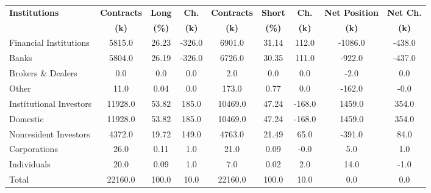 \documentclass[article,crop=false]{standalone}%
\begin{document}
%
\normalsize%
\setlength{\tabcolsep}{0.15cm}%
\begin{tabular}[h]{l | c c c | c c c | c c}%
\hline%
\rowcolor{white}%
\textbf{Institutions}&\textbf{Contracts}&\textbf{Long}&\textbf{Ch.}&\textbf{Contracts}&\textbf{Short}&\textbf{Ch.}&\textbf{Net Position}&\textbf{Net Ch.}\\%
\rowcolor{white}%
\textbf{}&\textbf{(k)}&\textbf{(\%)}&\textbf{(k)}&\textbf{(k)}&\textbf{(\%)}&\textbf{(k)}&\textbf{(k)}&\textbf{(k)}\\%
\hline%
\rowcolor{lightgray}%
Financial Institutions&5815.0&26.23&{-}326.0&6901.0&31.14&112.0&{-}1086.0&{-}438.0\\%
\rowcolor{white}%
Banks&5804.0&26.19&{-}326.0&6726.0&30.35&111.0&{-}922.0&{-}437.0\\%
\rowcolor{lightgray}%
Brokers \& Dealers&0.0&0.0&0.0&2.0&0.0&0.0&{-}2.0&0.0\\%
\rowcolor{white}%
Other&11.0&0.04&0.0&173.0&0.77&0.0&{-}162.0&{-}0.0\\%
\rowcolor{lightgray}%
Institutional Investors&11928.0&53.82&185.0&10469.0&47.24&{-}168.0&1459.0&354.0\\%
\rowcolor{white}%
Domestic&11928.0&53.82&185.0&10469.0&47.24&{-}168.0&1459.0&354.0\\%
\rowcolor{lightgray}%
Nonresident Investors&4372.0&19.72&149.0&4763.0&21.49&65.0&{-}391.0&84.0\\%
\rowcolor{white}%
Corporations&26.0&0.11&1.0&21.0&0.09&{-}0.0&5.0&1.0\\%
\rowcolor{lightgray}%
Individuals&20.0&0.09&1.0&7.0&0.02&2.0&14.0&{-}1.0\\%
\rowcolor{white}%
Total&22160.0&100.0&10.0&22160.0&100.0&10.0&0.0&0.0\\%
\hline%
\end{tabular}%
\end{document}
